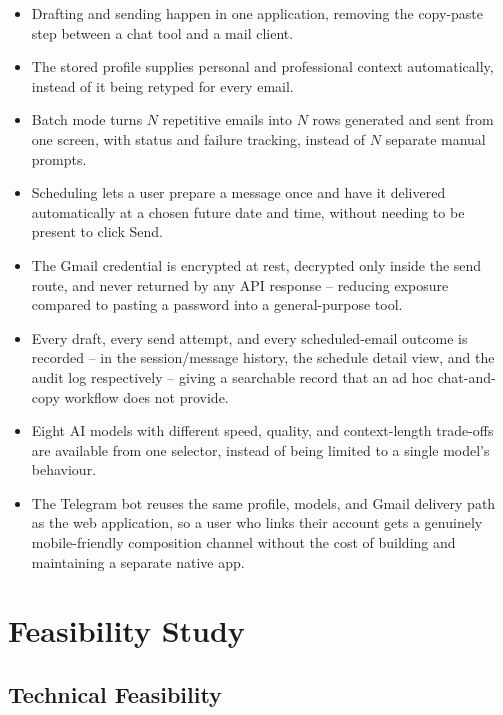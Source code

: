 \documentclass[12pt,a4paper]{article}
\begin{document}
\begin{itemize}[leftmargin=22pt]
  \item Drafting and sending happen in one application, removing the copy-paste step between a chat tool and a mail client.
  \item The stored profile supplies personal and professional context automatically, instead of it being retyped for every email.
  \item Batch mode turns $N$ repetitive emails into $N$ rows generated and sent from one screen, with status and failure tracking, instead of $N$ separate manual prompts.
  \item Scheduling lets a user prepare a message once and have it delivered automatically at a chosen future date and time, without needing to be present to click Send.
  \item The Gmail credential is encrypted at rest, decrypted only inside the send route, and never returned by any API response -- reducing exposure compared to pasting a password into a general-purpose tool.
  \item Every draft, every send attempt, and every scheduled-email outcome is recorded -- in the session/message history, the schedule detail view, and the audit log respectively -- giving a searchable record that an ad hoc chat-and-copy workflow does not provide.
  \item Eight AI models with different speed, quality, and context-length trade-offs are available from one selector, instead of being limited to a single model's behaviour.
  \item The Telegram bot reuses the same profile, models, and Gmail delivery path as the web application, so a user who links their account gets a genuinely mobile-friendly composition channel without the cost of building and maintaining a separate native app.
\end{itemize}

\section{Feasibility Study} 

\subsection{Technical Feasibility}
\end{document}

